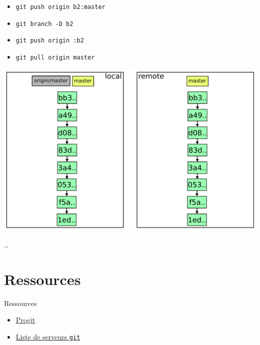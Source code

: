 \documentclass{beamer}
\newcommand{\git}{\texttt{git}}
\begin{document}
\begin{frame}{}
  \begin{itemize}
  \item \lstinline|git push origin b2:master|
  \item \lstinline|git branch -D b2|
  \item \lstinline|git push origin :b2|
  \item \lstinline|git pull origin master|
  \end{itemize}
\end{frame}

\begin{frame}{}
  \includegraphics[width=\textwidth]{img/10.pdf}
\end{frame}

\begin{frame}{}
  \begin{center}
  \Huge \dots
  \end{center}
\end{frame}


\section{Ressources}
\begin{frame}{Ressources}
  \begin{itemize}
  \item \href{http://progit.org/about.html}{Progit}
  \item \href{http://git.or.cz/gitwiki/GitHosting}{Liste de serveurs \git}
  \end{itemize}
\end{frame}
\end{document}
